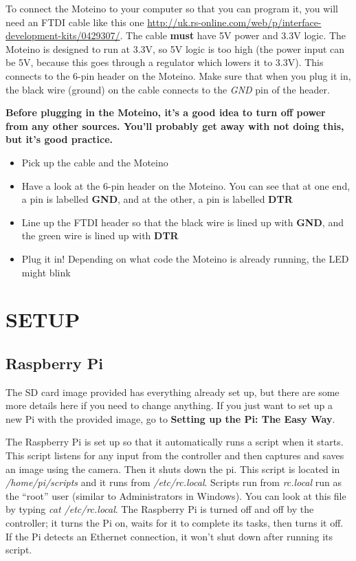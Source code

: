 \documentclass[10pt]{article}
\begin{document}
To connect the Moteino to your computer so that you can program it, you will need an FTDI cable like this one
\url{http://uk.rs-online.com/web/p/interface-development-kits/0429307/}. The cable \textbf{must} have 5V power and 3.3V logic. The Moteino is designed to run at 3.3V,
so 5V logic is too high (the power input can be 5V, because this goes through a regulator which lowers it to 3.3V). This connects to the 6-pin header on the Moteino. Make
sure that when you plug it in, the black wire (ground) on the cable connects to the \textit{GND} pin of the header. \newline

\textbf{Before plugging in the Moteino, it's a good idea to turn off power from any other sources. You'll probably get away with not doing this, but it's good practice.} \newline

\begin{itemize}
 \item Pick up the cable and the Moteino
 \item Have a look at the 6-pin header on the Moteino. You can see that at one end, a pin is labelled \textbf{GND}, and at the other, a pin is labelled \textbf{DTR}
 \item Line up the FTDI header so that the black wire is lined up with \textbf{GND}, and the green wire is lined up with \textbf{DTR}
 \item Plug it in! Depending on what code the Moteino is already running, the LED might blink
\end{itemize}

\section{SETUP}

\subsection{Raspberry Pi}
The SD card image provided has everything already set up, but there are some more details here if you need to change anything. If you just want to set up a new Pi with the
provided image, go to \textbf{Setting up the Pi: The Easy Way}.

The Raspberry Pi is set up so that it automatically runs a script when it starts. This script listens for any input from the controller and then captures and saves an image using the camera. Then it shuts down the pi. This script is located in \textit{/home/pi/scripts} and it runs from \textit{/etc/rc.local}. Scripts run from \textit{rc.local} run as the ``root'' user (similar to Administrators in Windows). You can look at this file by typing \textit{cat /etc/rc.local}. The Raspberry Pi is turned off and off by the controller; it turns the Pi on, waits for it to complete its tasks, then turns it off. If the Pi detects an Ethernet connection, it won't shut down after running its script.
\end{document}
